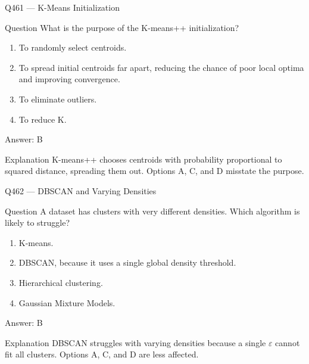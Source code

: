 \documentclass[aspectratio=169,8pt]{beamer}
\begin{document}
	\begin{frame}{Q461 --- K-Means Initialization}
		\begin{block}{Question}
			What is the purpose of the K-means++ initialization?
			\begin{enumerate}
				\item To randomly select centroids.
				\item To spread initial centroids far apart, reducing the chance of poor local optima and improving convergence.
				\item To eliminate outliers.
				\item To reduce K.
			\end{enumerate}
		\end{block}
		\begin{exampleblock}{Answer: B}\end{exampleblock}
		\begin{block}{Explanation}
			K-means++ chooses centroids with probability proportional to squared distance, spreading them out. Options A, C, and D misstate the purpose.
		\end{block}
	\end{frame}
	
	\begin{frame}{Q462 --- DBSCAN and Varying Densities}
		\begin{block}{Question}
			A dataset has clusters with very different densities. Which algorithm is likely to struggle?
			\begin{enumerate}
				\item K-means.
				\item DBSCAN, because it uses a single global density threshold.
				\item Hierarchical clustering.
				\item Gaussian Mixture Models.
			\end{enumerate}
		\end{block}
		\begin{exampleblock}{Answer: B}\end{exampleblock}
		\begin{block}{Explanation}
			DBSCAN struggles with varying densities because a single $\varepsilon$ cannot fit all clusters. Options A, C, and D are less affected.
		\end{block}
	\end{frame}
	
\end{document}
